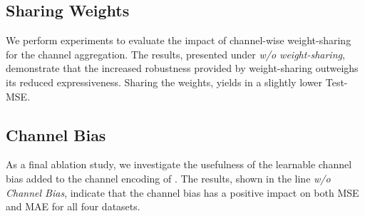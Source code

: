 \subsection{Sharing Weights}
We perform experiments to evaluate the impact of channel-wise weight-sharing for the channel aggregation. 
The results, presented under \emph{w/o weight-sharing}, demonstrate that the increased robustness provided by weight-sharing outweighs its reduced expressiveness.
Sharing the weights, yields in a slightly lower Test-MSE.\@

\subsection{Channel Bias}\label{sec:bias}
As a final ablation study, we investigate the usefulness of the learnable channel bias added to the channel encoding of \model{}. 
The results, shown in the line \emph{w/o Channel Bias}, indicate that the channel bias has a positive impact on both MSE and MAE for all four datasets.
